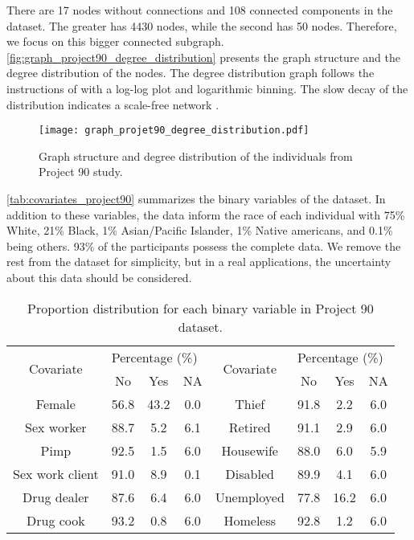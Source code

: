There are 17 nodes without connections and 108 connected
components in the dataset. The greater has 4430 nodes, while the second has 50
nodes. Therefore, we focus on this bigger connected subgraph. \autoref{fig:graph_project90_degree_distribution} presents the
graph structure and the degree distribution of the nodes. The degree
distribution graph follows the instructions of \textcite[Advanced Topic
3.A]{barabasi2013network} with a log-log plot and logarithmic binning. The
slow decay of the distribution indicates a scale-free network \cite{barabasi2013network}.

\begin{figure}
    \centering
    \caption{\label{fig:graph_project90_degree_distribution}Graph structure and
    degree distribution of the individuals from Project 90 study.}
    \texttt{[image: graph\_projet90\_degree\_distribution.pdf]}
\end{figure}

\autoref{tab:covariates_project90} summarizes the binary variables of the
dataset. In addition to these variables, the data inform the race of each
individual with 75\% White, 21\%  Black, 1\% Asian/Pacific Islander, 1\%
Native americans, and 0.1\% being others. 93\% of the participants possess the
complete data. We remove the rest from the dataset for simplicity, 
but in a real applications, the uncertainty about this data should be
considered.

\begin{table}[htbp]
    \centering
    \caption{\label{tab:covariates_project90}Proportion distribution for each
    binary variable in Project 90 dataset.}
    \begin{tabular}{cccccccc}
    \hline
    \multirow{2}{*}{Covariate} & \multicolumn{3}{l}{Percentage (\%)} & \multirow{2}{*}{Covariate} & \multicolumn{3}{l}{Percentage (\%)} \\ \cline{2-4} \cline{6-8} 
     & No & Yes & NA &  & No & Yes & NA \\ \hline
    Female & 56.8 & 43.2 & 0.0 & Thief & 91.8 & 2.2 & 6.0 \\
    Sex worker & 88.7 & 5.2 & 6.1 & Retired & 91.1 & 2.9 & 6.0 \\
    Pimp & 92.5 & 1.5 & 6.0 & Housewife & 88.0 & 6.0 & 5.9 \\
    Sex work client & 91.0 & 8.9 & 0.1 & Disabled & 89.9 & 4.1 & 6.0 \\
    Drug dealer & 87.6 & 6.4 & 6.0 & Unemployed & 77.8 & 16.2 & 6.0 \\
    Drug cook & 93.2 & 0.8 & 6.0 & Homeless & 92.8 & 1.2 & 6.0 \\ \hline
    \end{tabular}
\end{table}

